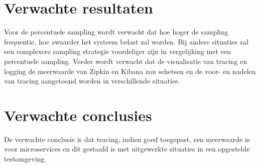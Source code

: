 \documentclass[fleqn,10pt]{voorstel}
\begin{document}
\section{Verwachte resultaten}
\label{sec:verwachte_resultaten}

Voor de percentuele sampling wordt verwacht dat hoe hoger de sampling frequentie, hoe zwaarder het systeem belast zal worden. Bij andere situaties zal een complexere sampling strategie voordeliger zijn in vergelijking met een percentuele sampling. Verder wordt verwacht dat de visualisatie van tracing en logging de meerwaarde van Zipkin en Kibana zou schetsen en de voor- en nadelen van tracing aangetoond worden in verschillende situaties. \\

\section{Verwachte conclusies}
\label{sec:verwachte_conclusies}

De verwachte conclusie is dat tracing, indien goed toegepast, een meerwaarde is voor microservices en dit gestaafd is met uitgewerkte situaties in een opgestelde testomgeving. \\


\printbibliography[heading=bibintoc]
\end{document}
